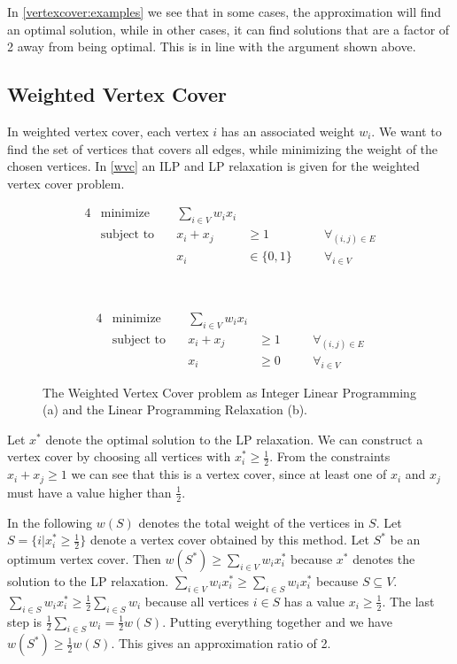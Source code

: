 \documentclass[a4paper]{article}
\begin{document}
	\noindent In \autoref{vertexcover:examples} we see that in some cases, the approximation will find an optimal solution, while in other cases, it can find solutions that are a factor of 2 away from being optimal. This is in line with the argument shown above.
	
	\subsection{Weighted Vertex Cover}
	In weighted vertex cover, each vertex $i$ has an associated weight $w_i$. We want to find the set of vertices that covers all edges, while minimizing the weight of the chosen vertices. In \autoref{wvc} an ILP and LP relaxation is given for the weighted vertex cover problem.
	
	\begin{figure}[H]
		\begin{subfigure}{.45\textwidth}
			\begin{alignat*}{4}
				& \text{minimize} & \sum_{i\in V}w_ix_i & &\\
				& \text{subject to} \quad & x_i + x_j & \geq 1 && \forall_{(i,j) \in E}\\
				& & x_i & \in \{ 0, 1 \} \quad && \forall_{i \in V}
			\end{alignat*}
			\caption{}
			\label{wvc:ilp}
		\end{subfigure}
		~
		\begin{subfigure}{.45\textwidth}
			\begin{alignat*}{4}
				& \text{minimize} & \sum_{i\in V}w_ix_i &\\
				& \text{subject to} \quad & x_i + x_j & \geq 1 && \forall_{(i,j) \in E}\\
				& & x_i & \geq 0 \quad && \forall_{i \in V}
			\end{alignat*}
			\caption{}
			\label{wvc:lp}
		\end{subfigure}
		\caption{The Weighted Vertex Cover problem as Integer Linear Programming (a) and the Linear Programming Relaxation (b).}
		\label{wvc}
	\end{figure}
	
	\noindent Let $x^*$ denote the optimal solution to the LP relaxation. We can construct a vertex cover by choosing all vertices with $x^*_i \geq \frac{1}{2}$. From the constraints $x_i + x_j \geq 1$ we can see that this is a vertex cover, since at least one of $x_i$ and $x_j$ must have a value higher than $\frac{1}{2}$.
	
	\noindent In the following $w(S)$ denotes the total weight of the vertices in $S$. Let $S = \{i | x^*_i \geq \frac{1}{2}\}$ denote a vertex cover obtained by this method. Let $S^*$ be an optimum vertex cover. Then $w(S^*) \geq \sum_{i \in V} w_i x^*_i$ because $x^*$ denotes the solution to the LP relaxation. $\sum_{i \in V} w_i x^*_i \geq \sum_{i \in S} w_i x^*_i$ because $S \subseteq V$. $\sum_{i \in S} w_i x^*_i \geq \frac{1}{2}\sum_{i \in S} w_i$ because all vertices $i \in S$ has a value $x_i \geq \frac{1}{2}$. The last step is $\frac{1}{2}\sum_{i \in S} w_i = \frac{1}{2}w(S)$. Putting everything together and we have $w(S^*) \geq \frac{1}{2}w(S)$. This gives an approximation ratio of 2.
\end{document}
